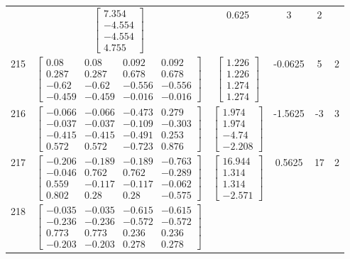\documentclass[a4paper,12pt]{article}
\begin{document}
\begin{tabular}{c c c c c c}
&
$\begin{bmatrix} 7.354 \\ -4.554 \\ -4.554 \\ 4.755 \end{bmatrix}$
&
0.625
&
3
&
2
\\
215
&
$\begin{bmatrix} 0.08 & 0.08 & 0.092 & 0.092 \\ 0.287 & 0.287 & 0.678 & 0.678 \\ -0.62 & -0.62 & -0.556 & -0.556 \\ -0.459 & -0.459 & -0.016 & -0.016 \end{bmatrix}$
&
$\begin{bmatrix} 1.226 \\ 1.226 \\ 1.274 \\ 1.274 \end{bmatrix}$
&
-0.0625
&
5
&
2
\\
216
&
$\begin{bmatrix} -0.066 & -0.066 & -0.473 & 0.279 \\ -0.037 & -0.037 & -0.109 & -0.303 \\ -0.415 & -0.415 & -0.491 & 0.253 \\ 0.572 & 0.572 & -0.723 & 0.876 \end{bmatrix}$
&
$\begin{bmatrix} 1.974 \\ 1.974 \\ -4.74 \\ -2.208 \end{bmatrix}$
&
-1.5625
&
-3
&
3
\\
217
&
$\begin{bmatrix} -0.206 & -0.189 & -0.189 & -0.763 \\ -0.046 & 0.762 & 0.762 & -0.289 \\ 0.559 & -0.117 & -0.117 & -0.062 \\ 0.802 & 0.28 & 0.28 & -0.575 \end{bmatrix}$
&
$\begin{bmatrix} 16.944 \\ 1.314 \\ 1.314 \\ -2.571 \end{bmatrix}$
&
0.5625
&
17
&
2
\\
218
&
$\begin{bmatrix} -0.035 & -0.035 & -0.615 & -0.615 \\ -0.236 & -0.236 & -0.572 & -0.572 \\ 0.773 & 0.773 & 0.236 & 0.236 \\ -0.203 & -0.203 & 0.278 & 0.278 \end{bmatrix}$

\end{tabular}
\end{document}
